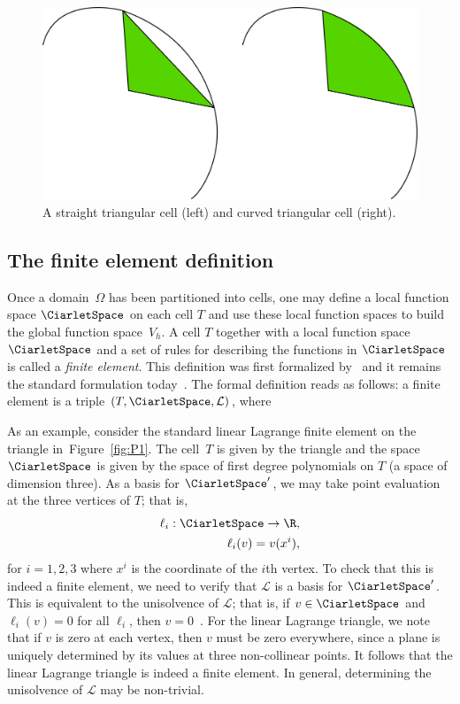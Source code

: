 \begin{figure}
  \center\includegraphics[width=\largefig]{chapters/kirby-7/pdf/straight_and_curved_triangles.pdf}
  \caption{A straight triangular cell (left) and curved triangular
    cell (right).}
  \label{fig:shapes,curved}
\end{figure}

\subsection{The finite element definition}

Once a domain~$\Omega$ has been partitioned into cells, one may define
a local function space $\CiarletSpace$ on each cell $T$ and use these
local function spaces to build the global function space~$V_h$. A cell
$T$ together with a local function space $\CiarletSpace$ and a set of
rules for describing the functions in $\CiarletSpace$ is called a
\emph{finite element}. This definition was first
formalized by~\citet{Ciarlet1976} and it remains the standard
formulation today~\citep{BrennerScott2008}. The formal definition
reads as follows: a finite element is a triple $(T,
\CiarletSpace, \mathcal{L})$, where
\femdefinition{}

As an example, consider the standard linear Lagrange finite element on
the triangle in~Figure~\ref{fig:P1}. The cell~$T$ is given by the
triangle and the space $\CiarletSpace$ is given by the space of first
degree polynomials on $T$ (a space of dimension three). As a basis for
$\CiarletSpace'$, we may take point evaluation at the three vertices
of $T$; that is,
\begin{equation}
  \begin{split}
    \ell_i : \CiarletSpace \rightarrow \R,
    \\
    \ell_i(v) = v(x^i),
  \end{split}
\end{equation}
for $i=1,2,3$ where $x^i$ is the coordinate of the $i$th vertex. To
check that this is indeed a finite element, we need to verify that
$\mathcal{L}$ is a basis for $\CiarletSpace'$. This is equivalent to
the unisolvence of $\mathcal{L}$; that is, if $v\in\CiarletSpace$ and
$\ell_i(v) = 0$ for all $\ell_i$, then $v =
0$~\citep{BrennerScott2008}. For the linear Lagrange triangle, we note
that if $v$ is zero at each vertex, then $v$ must be zero everywhere,
since a plane is uniquely determined by its values at three
non-collinear points. It follows that the linear Lagrange triangle is
indeed a finite element. In general, determining the unisolvence of
$\mathcal{L}$ may be non-trivial.

